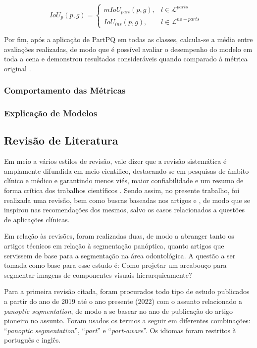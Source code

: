 \begin{equation}
\label{project:avaliation:eq:2}
    IoU_p(p,g)= \left\{\begin{matrix}
        mIoU_{part}(p,g), & l \in \mathcal{L}^{parts}    & \\ 
        IoU_{ins}(p,g),        & l \in \mathcal{L}^{no-parts} & 
    \end{matrix}\right.
\end{equation}

Por fim, após a aplicação de PartPQ em todas as classes, calcula-se a média entre avaliações realizadas, de modo que é possível avaliar o desempenho do modelo em toda a cena e demonstrou resultados consideráveis quando comparado à métrica original \cite{DeGeus2021}.

\subsubsection{Comportamento das Métricas}

\subsubsection{Explicação de Modelos}


\subsection{Revisão de Literatura}
\label{project:revision}
Em meio a vários estilos de revisão, vale dizer que a revisão sistemática é amplamente difundida em meio cientifico, destacando-se em pesquisas de âmbito clínico e médico e garantindo menos viés, maior confiabilidade e um resumo de forma crítica dos trabalhos científicos \cite{barbosa2019}. Sendo assim, no presente trabalho, foi realizada uma revisão, bem como buscas baseadas nos artigos \cite{barbosa2019} e \cite{liberati2009}, de modo que se inspirou nas recomendações dos mesmos, salvo os casos relacionados a questões de aplicações clínicas.

Em relação às revisões, foram realizadas duas, de modo a abranger tanto os artigos técnicos em relação à segmentação panóptica, quanto artigos que servissem de base para a segmentação na área odontológica. A questão a ser tomada como base para esse estudo é: Como projetar um arcabouço para segmentar imagens de componentes visuais hierarquicamente?

Para a primeira revisão citada, foram procurados todo tipo de estudo publicados a partir do ano de 2019 até o ano presente (2022) com o assunto relacionado a \textit{panoptic segmentation}, de modo a se basear no ano de publicação do artigo pioneiro \cite{Kirillov2019a} no assunto. Foram usados os termos a seguir em diferentes combinações: ``\textit{panoptic segmentation}'', ``\textit{part}'' e ``\textit{part-aware}''. Os idiomas foram restritos à português e inglês.

